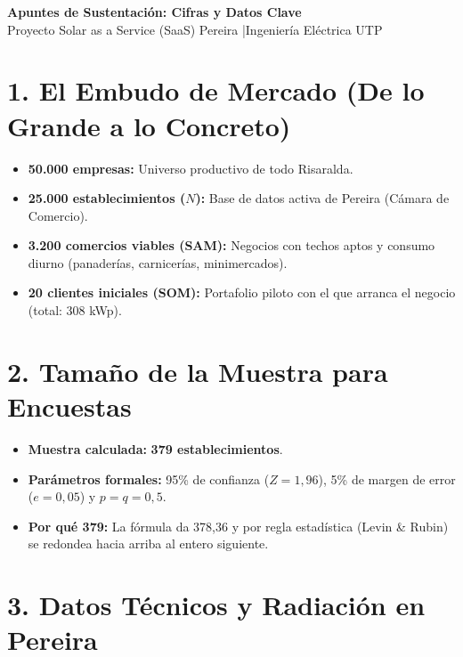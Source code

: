 \documentclass[11pt,letterpaper]{article}
\begin{document}
{\LARGE \textbf{\color{navy}Apuntes de Sustentación: Cifras y Datos Clave}}\\[2pt]
{\small\color{subgray} Proyecto Solar as a Service (SaaS) Pereira \quad|\quad Ingeniería Eléctrica UTP}

\vspace{0.3cm}

\section*{1. El Embudo de Mercado (De lo Grande a lo Concreto)}

\begin{itemize}[leftmargin=1.5em, itemsep=4pt]
    \item \textbf{50.000 empresas:} Universo productivo de todo Risaralda.
    \item \textbf{25.000 establecimientos ($N$):} Base de datos activa de Pereira (Cámara de Comercio).
    \item \textbf{3.200 comercios viables (SAM):} Negocios con techos aptos y consumo diurno (panaderías, carnicerías, minimercados).
    \item \textbf{20 clientes iniciales (SOM):} Portafolio piloto con el que arranca el negocio (total: 308 kWp).
\end{itemize}

\section*{2. Tamaño de la Muestra para Encuestas}

\begin{itemize}[leftmargin=1.5em, itemsep=4pt]
    \item \textbf{Muestra calculada:} \textbf{379 establecimientos}.
    \item \textbf{Parámetros formales:} 95\% de confianza ($Z = 1,96$), 5\% de margen de error ($e = 0,05$) y $p = q = 0,5$.
    \item \textbf{Por qué 379:} La fórmula da 378,36 y por regla estadística (Levin \& Rubin) se redondea hacia arriba al entero siguiente.
\end{itemize}

\section*{3. Datos Técnicos y Radiación en Pereira}
\end{document}
